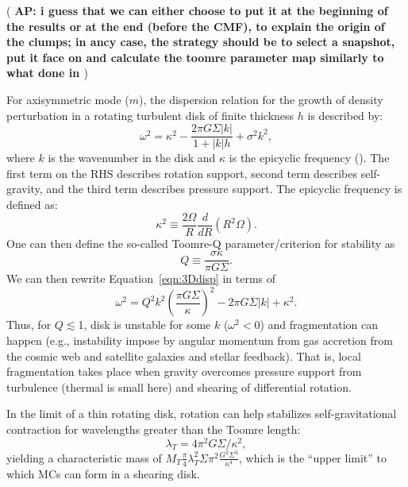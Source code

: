 \documentclass[apj]{emulateapj} %
\newcommand{\AP}[1]{({\bf \color{apcolor} AP: #1})}
\begin{document}
{\AP{i guess that we can either choose to put it at the beginning of the results or at the end (before the CMF), to explain the origin of the clumps; in ancy case, the strategy should be to select a snapshot, put it face on and calculate the toomre parameter map similarly to what done in \citet{Inoue16a}}


For axisymmetric mode ($m$), the dispersion relation for the growth of density perturbation in a rotating turbulent disk
of finite thickness $h$
is described by:
\begin{equation}
\omega^2 = \kappa^2 - \frac{2\pi G \Sigma |k|}{1 + |k| h} + \sigma^2 k^2,
\label{eqn:3Ddisp}
\end{equation}
where $k$ is the wavenumber in the disk and $\kappa$ is the epicyclic frequency (\citealt{Toomre64a}).
The first term on the RHS describes rotation support, second term describes self-gravity, and
the third term describes pressure support.
The epicyclic frequency is defined as:
\begin{equation}
\kappa^2\equiv\frac{2\Omega}{R}\frac{d}{dR}\left(R^2\Omega\right).
\label{eqn:kappa}
\end{equation}
One can then define the so-called Toomre-Q parameter/criterion for stability as
\begin{equation}
Q\equiv\frac{\sigma\kappa}{\pi G \Sigma}.
\label{eqn:Q}
\end{equation}
We can then rewrite Equation~\ref{eqn:3Ddisp} in terms of
\begin{equation}
\omega^2 = Q^2 k^2 \left(\frac{\pi G \Sigma}{\kappa}\right)^2 - 2\pi G \Sigma |k| + \kappa^2.
\end{equation}
Thus, for $Q\lesssim$1, disk is unstable for some $k$ ($\omega^2 < 0$)
and fragmentation can happen
(e.g., instability impose by angular momentum from gas accretion from the cosmic web and
satellite galaxies and stellar feedback).
That is, local fragmentation takes place when gravity overcomes pressure support
from turbulence (thermal is small here) and shearing of differential rotation.

In the limit of a thin rotating disk, rotation can help stabilizes
self-gravitational contraction for wavelengths greater than the Toomre length:
\begin{equation}
\lambda_T = 4\pi^2 G\Sigma/\kappa^2,
\end{equation}
yielding a characteristic mass of $M_T$\eq$\frac{\pi}{4}{\lambda_T^2}{\Sigma}$$\pi^2\frac{G^2\Sigma^3}{\kappa^4}$,
which is the ``upper limit'' to which MCs can form in a shearing disk.








}
\end{document}
